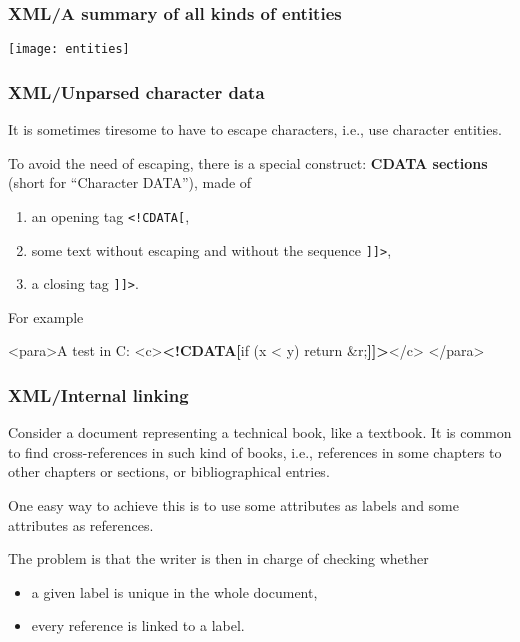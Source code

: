 %
\begin{frame}
\frametitle{XML/A summary of all kinds of entities}

\begin{center}
\texttt{[image: entities]}
\end{center}

\end{frame}

%
\begin{frame}[containsverbatim]
\frametitle{XML/Unparsed character data}

It is sometimes tiresome to have to escape characters, i.e., use
character entities.

\bigskip

To avoid the need of escaping, there is a special construct:
\textbf{CDATA sections} (short for ``Character DATA''), made of
\begin{enumerate}

  \item an opening tag \verb|<!CDATA[|,

  \item some text without escaping and without the sequence \verb|]]>|,

  \item a closing tag \verb|]]>|.

\end{enumerate}
For example 
\begin{semiverbatim}
<para>A test in C:
  <c>\textbf{<!CDATA[}if (x < y) return &r;\textbf{]]>}</c>
</para>
\end{semiverbatim}

\end{frame}

%
\begin{frame}
\frametitle{XML/Internal linking}

Consider a document representing a technical book, like a textbook. It
is common to find cross-references in such kind of books, i.e.,
references in some chapters to other chapters or sections, or
bibliographical entries.

\bigskip

One easy way to achieve this is to use some attributes as labels and
some attributes as references.

\bigskip

The problem is that the writer is then in charge of checking whether 
\begin{itemize}

  \item a given label is unique in the whole document,

  \item every reference is linked to a label.

\end{itemize}

\end{frame}

